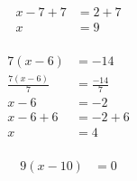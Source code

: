\documentclass[12pt]{article}
\newcounter{minipagecount}
\begin{document}
\begin{multicols}{2}
\begin{minipage}[t]{0.45\textwidth}
\begin{align*}
        x - 7 + 7 &= 2 + 7\\
        x &= 9\\
    \end{align*}
\end{minipage} %
\noindent{(\theminipagecount)}\hspace{0.1mm} %
\begin{minipage}[t]{0.45\textwidth} %
    \vspace{-26pt}  %
    \raggedright %
    \begin{align*} %
        7(x - 6) &= -14\\
        \frac{7(x-6)}{7} &= \frac{-14}{7}\\
        x - 6 &= -2\\
        x - 6 + 6 &= -2 + 6\\
        x &= 4\\
    \end{align*}
\end{minipage} %
\noindent{(\theminipagecount)}\hspace{0.1mm} %
\begin{minipage}[t]{0.45\textwidth} %
    \vspace{-26pt}  %
    \raggedright %
    \begin{align*} %
        9(x - 10) &= 0\\

\end{align*}
\end{minipage}
\end{multicols}
\end{document}
